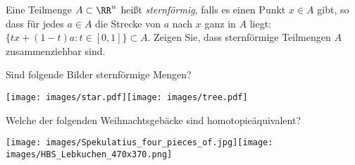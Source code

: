 \begin{exercise}
Eine Teilmenge $A\subset\RR^n$ heißt \emph{sternförmig}, falls es einen Punkt
$x\in A$ gibt, so dass für jedes $a\in A$ die Strecke von $a$ nach $x$ ganz in
$A$ liegt: $\{tx + (1-t)a : t\in[0,1]\}\subset A$. Zeigen Sie, dass sternförmige
Teilmengen $A$ zusammenziehbar sind.

Sind folgende Bilder sternförmige Mengen?
\begin{center}
\texttt{[image: images/star.pdf]}\quad\texttt{[image: images/tree.pdf]}
\end{center}

Welche der folgenden Weihnachtsgebäcke sind homotopieäquivalent?
\begin{center}
\texttt{[image: images/Spekulatius\_four\_pieces\_of.jpg]}\quad\texttt{[image: images/HBS\_Lebkuchen\_470x370.png]}
\end{center}
\end{exercise}

